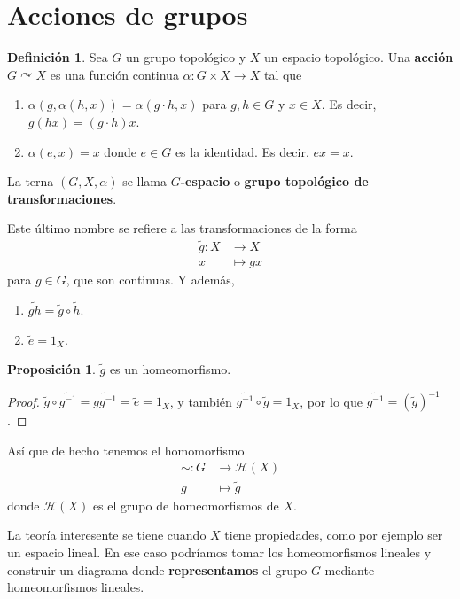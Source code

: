 \documentclass[spanish]{article}
\theoremstyle{definition}
\newtheorem*{defn}{Definición}
\newtheorem*{prop}{Proposición}
\newcommand{\Hom}{\mathcal{H}}
\begin{document}
\section{Acciones de grupos}
\begin{defn}
	Sea $G$ un grupo topológico y $X$ un espacio topológico. Una \textbf{acción} $G\curvearrowright X$ es una función continua $\alpha:G\times X\to X$ tal que
	\begin{enumerate}
		\item $\alpha(g,\alpha(h,x))=\alpha(g\cdot h,x)$ para $g,h\in G$ y $x\in X$. Es decir, $g(hx)=(g\cdot h)x$.
		\item $\alpha(e,x)=x$ donde $e\in G$ es la identidad. Es decir, $ex=x$.
	\end{enumerate}
	La terna $(G,X,\alpha)$ se llama \textbf{$G$-espacio} o \textbf{grupo topológico de transformaciones}.
\end{defn}
Este último nombre se refiere a las transformaciones de la forma
\begin{align*}
	\tilde{g}:X&\to X\\
	x&\mapsto gx
\end{align*}
para $g\in G$, que son continuas. Y además,
\begin{enumerate}
	\item $\widetilde{gh}=\tilde{g}\circ\tilde{h}$.
	\item $\tilde{e}=1_X$.
\end{enumerate}
\begin{prop}
	$\tilde{g}$ es un homeomorfismo.
\end{prop}
\begin{proof}
	$\tilde{g}\circ\widetilde{g^{-1}}=\widetilde{gg^{-1}}=\tilde{e}=1_X$, y también $\widetilde{g^{-1}}\circ\tilde{g}=1_X$, por lo que $\widetilde{g^{-1}}=(\tilde{g})^{-1}$.
\end{proof}
Así que de hecho tenemos el homomorfismo
\begin{align*}
	\sim:G&\to \Hom(X)\\
	g&\mapsto\tilde{g}
\end{align*}
donde $\Hom(X)$ es el grupo de homeomorfismos de $X$.

La teoría interesente se tiene cuando $X$ tiene propiedades, como por ejemplo ser un espacio lineal. En ese caso podríamos tomar los homeomorfismos lineales y construir un diagrama donde \textbf{representamos} el grupo $G$ mediante homeomorfismos lineales.
\end{document}
